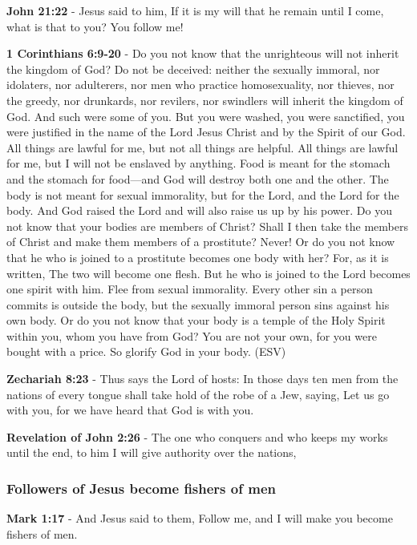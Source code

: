 \documentclass[11pt]{article}
\begin{document}
\textbf{John 21:22} - Jesus said to him, If it is my will that he remain until I come, what is that to you? You follow me!

\textbf{1 Corinthians 6:9-20} -  Do you not know that the unrighteous will not inherit the kingdom of God?  Do not be deceived: neither the sexually immoral, nor idolaters, nor adulterers, nor men who practice homosexuality, nor thieves, nor the greedy, nor drunkards, nor revilers, nor swindlers will inherit the kingdom of God.  And such were some of you.  But you were washed, you were sanctified, you were justified in the name of the Lord Jesus Christ and by the Spirit of our God.  All things are lawful for me, but not all things are helpful.  All things are lawful for me, but I will not be enslaved by anything.  Food is meant for the stomach and the stomach for food—and God will destroy both one and the other.  The body is not meant for sexual immorality, but for the Lord, and the Lord for the body.  And God raised the Lord and will also raise us up by his power.  Do you not know that your bodies are members of Christ?  Shall I then take the members of Christ and make them members of a prostitute?  Never! Or do you not know that he who is joined to a prostitute becomes one body with her?  For, as it is written, The two will become one flesh.  But he who is joined to the Lord becomes one spirit with him.  Flee from sexual immorality.  Every other sin a person commits is outside the body, but the sexually immoral person sins against his own body.  Or do you not know that your body is a temple of the Holy Spirit within you, whom you have from God?  You are not your own, for you were bought with a price.  So glorify God in your body.  (ESV)

\textbf{Zechariah 8:23} - Thus says the Lord of hosts: In those days ten men from the nations of every tongue shall take hold of the robe of a Jew, saying, Let us go with you, for we have heard that God is with you.

\textbf{Revelation of John 2:26} - The one who conquers and who keeps my works until the end, to him I will give authority over the nations,

\subsubsection{Followers of Jesus become fishers of men}
\label{sec:orgc279c54}

\textbf{Mark 1:17} - And Jesus said to them, Follow me, and I will make you become fishers of men.
\end{document}
